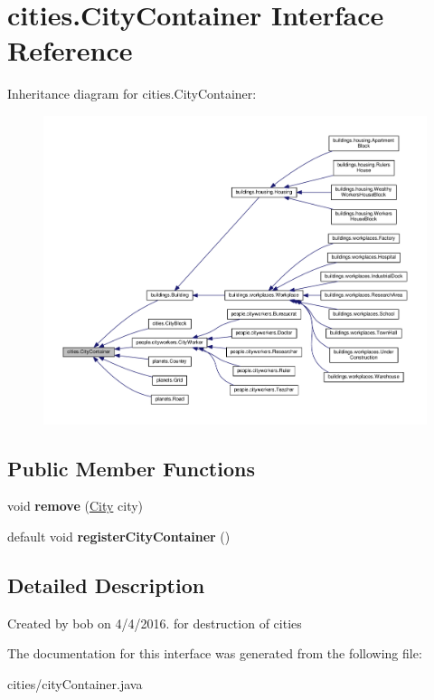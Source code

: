 \hypertarget{interfacecities_1_1_city_container}{}\section{cities.\+City\+Container Interface Reference}
\label{interfacecities_1_1_city_container}


Inheritance diagram for cities.\+City\+Container\+:\nopagebreak
\begin{figure}[H]
\begin{center}
\leavevmode
\includegraphics[width=350pt]{interfacecities_1_1_city_container__inherit__graph}
\end{center}
\end{figure}
\subsection*{Public Member Functions}
\begin{DoxyCompactItemize}
\item 
void {\bfseries remove} (\hyperlink{classcities_1_1_city}{City} city)\hypertarget{interfacecities_1_1_city_container_a48941840539598a447b300089f1a50ee}{}\label{interfacecities_1_1_city_container_a48941840539598a447b300089f1a50ee}

\item 
default void {\bfseries register\+City\+Container} ()\hypertarget{interfacecities_1_1_city_container_a640c0b424c57376e70d45432c6c5d4ec}{}\label{interfacecities_1_1_city_container_a640c0b424c57376e70d45432c6c5d4ec}

\end{DoxyCompactItemize}


\subsection{Detailed Description}
Created by bob on 4/4/2016. for destruction of cities 

The documentation for this interface was generated from the following file\+:\begin{DoxyCompactItemize}
\item 
cities/city\+Container.\+java\end{DoxyCompactItemize}
